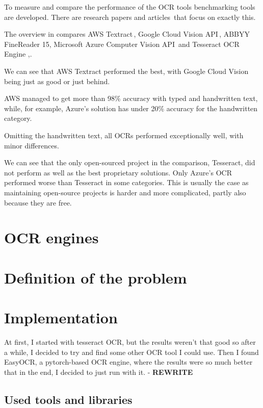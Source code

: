 \documentclass[
  digital,     %
  oneside,     %
  nosansbold,  %
  nocolorbold, %
  nolof,         %
  nolot,         %
]{fithesis4}
\begin{document}
To measure and compare the performance of the OCR tools benchmarking tools are developed. There are research papers and articles\,\cite{benchmark} that focus on exactly this.

The overview in \cite{benchmark} compares AWS Textract\,\cite{awstextract}, Google Cloud Vision API\,\cite{googleapi}, ABBYY FineReader 15, Microsoft Azure Computer Vision API\,\cite{azurevision} and Tesseract OCR Engine
,\cite{tesseract}.

We can see that AWS Textract performed the best, with Google Cloud Vision being just as good or just behind.

AWS managed to get more than 98\% accuracy with typed and handwritten text, while, for example, Azure's solution has under 20\% accuracy for the handwritten category.

Omitting the handwritten text, all OCRs performed exceptionally well, with minor differences.

We can see that the only open-sourced project in the comparison, Tesseract, did not perform as well as the best proprietary solutions. Only Azure's OCR performed worse than Tesseract in some categories. This is usually the case as maintaining open-source projects is harder and more complicated, partly also because they are free.

\chapter{OCR engines}

\chapter{Definition of the problem}

\chapter{Implementation}

At first, I started with tesseract OCR, but the results weren't that good so after a while, I decided to try and find some other OCR tool I could use. Then I found EasyOCR, a pytorch-based OCR engine, where the results were so much better that in the end, I decided to just run with it. - \textbf{REWRITE}

\section{Used tools and libraries}
\end{document}
